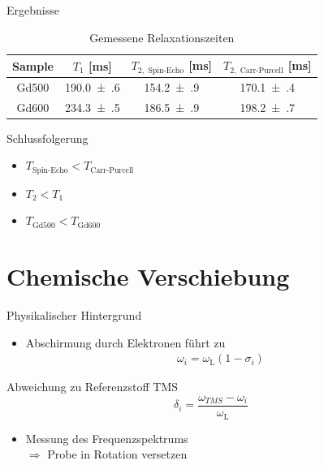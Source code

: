 \begin{frame}{Ergebnisse}
	\begin{table}
	\centering
	\begin{tabular}{cccc}
	\toprule
	Sample & $T_1$ [ms] & $T_{2,\text{ Spin-Echo}}$ [ms] & $T_{2,\text{ Carr-Purcell}}$ [ms]\\
	\midrule
	Gd500 & \num{190.0(6)} & \num{154.2(9)} & \num{170.1(4)}\\
	Gd600 & \num{234.3(5)} & \num{186.5(9)} & \num{198.2(7)}\\
	\bottomrule
	\end{tabular}
	\caption{Gemessene Relaxationszeiten}
	\end{table}
	\begin{block}{Schlussfolgerung}
	\begin{itemize}
	\item $T_\text{Spin-Echo} < T_\text{Carr-Purcell}$
	\item $T_2 < T_1$
	\item $T_\text{Gd500} < T_\text{Gd600}$	
	\end{itemize}
	\end{block}
\end{frame}




\section{Chemische Verschiebung}

\begin{frame}{Physikalischer Hintergrund}
	\begin{itemize}
	\item Abschirmung durch Elektronen führt zu
	\begin{align*}
	\omega_i=\omega_\text{L}(1-\sigma_i)
	\end{align*}
	\end{itemize}
	\begin{block}{Abweichung zu Referenzstoff TMS}
	\[
	\delta_i=\frac{\omega_{TMS}-\omega_i}{\omega_\text{L}}
	\]
	\end{block}
	\begin{itemize}
	\item Messung des Frequenzspektrums\\
	$\Rightarrow$ Probe in Rotation versetzen
	\end{itemize}
\end{frame}

